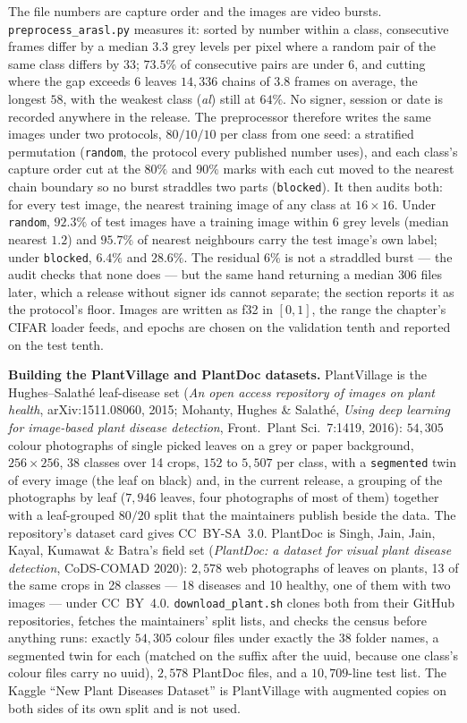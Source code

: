 The file numbers are capture order and the images are video bursts.
\texttt{preprocess\_arasl.py} measures it: sorted by number within a
class, consecutive frames differ by a median $3.3$ grey levels per pixel
where a random pair of the same class differs by $33$; $73.5\%$ of
consecutive pairs are under $6$, and cutting where the gap exceeds $6$
leaves $14{,}336$ chains of $3.8$ frames on average, the longest $58$, with
the weakest class (\emph{al}) still at $64\%$. No signer, session or date
is recorded anywhere in the release. The preprocessor therefore writes the
same images under two protocols, $80/10/10$ per class from one seed: a
stratified permutation (\texttt{random}, the protocol every published
number uses), and each class's capture order cut at the $80\%$ and $90\%$
marks with each cut moved to the nearest chain boundary so no burst
straddles two parts (\texttt{blocked}). It then audits both: for every
test image, the nearest training image of any class at $16\times16$. Under
\texttt{random}, $92.3\%$ of test images have a training image within $6$
grey levels (median nearest $1.2$) and $95.7\%$ of nearest neighbours carry
the test image's own label; under \texttt{blocked}, $6.4\%$ and $28.6\%$.
The residual $6\%$ is not a straddled burst --- the audit checks that none
does --- but the same hand returning a median $306$ files later, which a
release without signer ids cannot separate; the section reports it as the
protocol's floor. Images are written as f32 in $[0,1]$, the range the
chapter's CIFAR loader feeds, and epochs are chosen on the validation tenth
and reported on the test tenth.

\medskip\noindent\textbf{Building the PlantVillage and PlantDoc datasets.}
PlantVillage is the Hughes--Salath\'e leaf-disease set (\emph{An open access
repository of images on plant health}, arXiv:1511.08060, 2015; Mohanty,
Hughes \& Salath\'e, \emph{Using deep learning for image-based plant disease
detection}, Front.\ Plant Sci.~7:1419, 2016): $54{,}305$ colour photographs
of single picked leaves on a grey or paper background, $256\times256$, 38
classes over 14 crops, $152$ to $5{,}507$ per class, with a
\texttt{segmented} twin of every image (the leaf on black) and, in the
current release, a grouping of the photographs by leaf ($7{,}946$ leaves,
four photographs of most of them) together with a leaf-grouped $80/20$ split
that the maintainers publish beside the data. The repository's dataset card
gives CC~BY-SA~3.0. PlantDoc is Singh, Jain, Jain, Kayal, Kumawat \&
Batra's field set (\emph{PlantDoc: a dataset for visual plant disease
detection}, CoDS-COMAD 2020): $2{,}578$ web photographs of leaves on plants,
13 of the same crops in 28 classes --- 18 diseases and 10 healthy, one of
them with two images --- under CC~BY~4.0. \texttt{download\_plant.sh}
clones both from their GitHub repositories, fetches the maintainers' split
lists, and checks the census before anything runs: exactly $54{,}305$ colour
files under exactly the 38 folder names, a segmented twin for each (matched
on the suffix after the uuid, because one class's colour files carry no
uuid), $2{,}578$ PlantDoc files, and a $10{,}709$-line test list. The
Kaggle ``New Plant Diseases Dataset'' is PlantVillage with augmented copies on
both sides of its own split and is not used.

